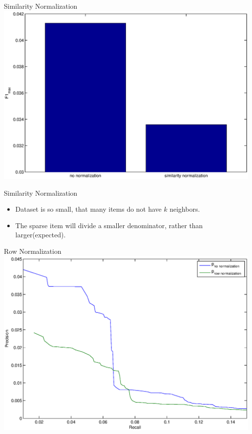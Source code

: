 \documentclass{beamer}
\begin{document}
\begin{frame}{Similarity Normalization}
\includegraphics[width=\linewidth]{./sim_norm_f1.eps}
\end{frame}


\begin{frame}{Similarity Normalization}

\begin{itemize}
\item Dataset is so small, that many items do not have $k$ neighbors.
\item The sparse item will divide a smaller denominator, rather than larger(expected).
\end{itemize}

\end{frame}


\begin{frame}{Row Normalization}
\includegraphics[width=\linewidth]{./row_norm.eps}
\end{frame}
\end{document}
